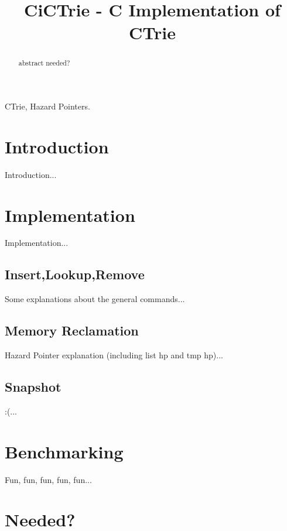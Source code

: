 \documentclass[conference]{IEEEtran}
\begin{document}
%
\title{CiCTrie - C Implementation of CTrie}


\author{
\and
{}
}

\maketitle


\begin{abstract}
	abstract needed?
\end{abstract}

\begin{IEEEkeywords}
	CTrie, Hazard Pointers.
\end{IEEEkeywords}

\IEEEpeerreviewmaketitle

\section{Introduction}
	Introduction...

\section{Implementation}
	Implementation...
	
\subsection{Insert,Lookup,Remove}
	Some explanations about the general commands...
	
\subsection{Memory Reclamation}
	Hazard Pointer explanation (including list hp and tmp hp)...
	
\subsection{Snapshot}
	:(...

\section{Benchmarking}
	Fun, fun, fun, fun, fun...

\appendices
\section{Needed?}


\end{document}
